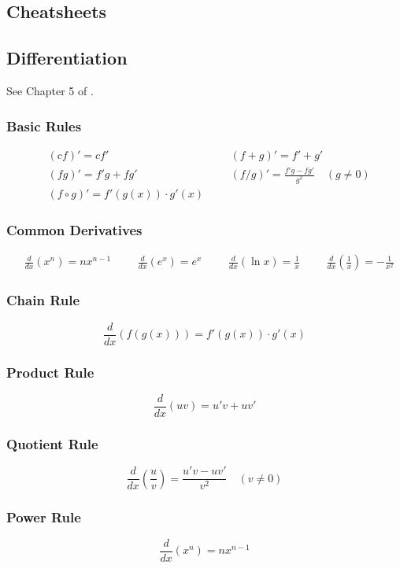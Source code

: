 \documentclass[11pt,a4paper]{book}
\theoremstyle{definition}\newtheorem{definition}{Definition}
\theoremstyle{definition}\newtheorem{fact}{Fact}
\theoremstyle{definition}\newtheorem{remark}{Remark}
\theoremstyle{definition}\newtheorem{ex}{Ex.}
\theoremstyle{definition}\newtheorem{project}{Project}
\theoremstyle{definition}\newtheorem{problem}{Problem}
\theoremstyle{definition}\newtheorem{example}{Example}
\numberwithin{theorem}{section}
\numberwithin{corollary}{chapter}
\numberwithin{assumption}{chapter}
\numberwithin{definition}{chapter}
\numberwithin{prop}{chapter}
\numberwithin{notation}{chapter}
\numberwithin{problem}{chapter}
\numberwithin{example}{chapter}
\numberwithin{fact}{chapter}
\numberwithin{ex}{chapter}
\begin{document}
	\begin{appendices}
	
	\chapter{Cheatsheets}
		\section{Differentiation}
	See Chapter 5 of \citet{springcamp}.
	\subsection*{Basic Rules}
	\begin{align*}
		&(cf)' = cf' &&
		&(f+g)' = f' + g' \\
		&(fg)' = f'g + fg' &&
		&(f/g)' = \frac{f'g - fg'}{g^2} \quad (g \neq 0) \\
		&(f \circ g)' = f'(g(x)) \cdot g'(x)
	\end{align*}
	
	\subsection*{Common Derivatives}
	\begin{align*}
		&\frac{d}{dx} (x^n) = nx^{n-1} &&
		&\frac{d}{dx} (e^x) = e^x &&
		&\frac{d}{dx} (\ln x) = \frac{1}{x} &&
		&\frac{d}{dx} \left(\frac{1}{x}\right) = -\frac{1}{x^2}
	\end{align*}
	
	\subsection*{Chain Rule}
	\[
	\frac{d}{dx} (f(g(x))) = f'(g(x)) \cdot g'(x)
	\]
	
	\subsection*{Product Rule}
	\[
	\frac{d}{dx} (uv) = u'v + uv'
	\]
	
	\subsection*{Quotient Rule}
	\[
	\frac{d}{dx} \left( \frac{u}{v} \right) = \frac{u'v - uv'}{v^2} \quad (v \neq 0)
	\]
	
	\subsection*{Power Rule}
	\[
	\frac{d}{dx} (x^n) = nx^{n-1}
	\]
	

\end{appendices}
\end{document}
